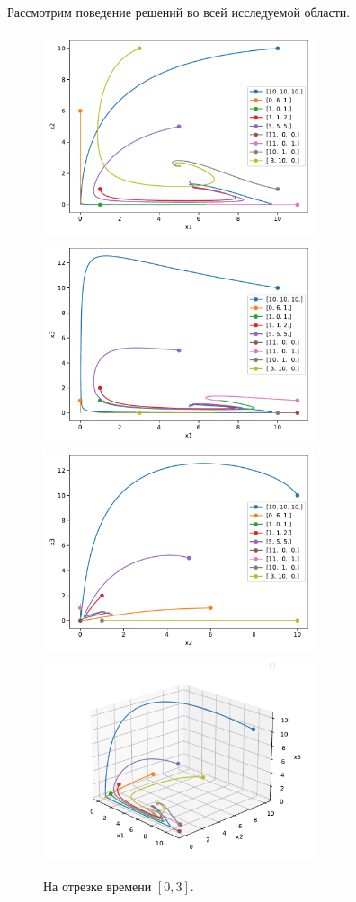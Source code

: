     Рассмотрим поведение решений во всей исследуемой области.
    \begin{figure}[H]
        \centering
        \includegraphics[width=8cm]{pictures/kx_12phase.pdf}
        \includegraphics[width=8cm]{pictures/kx_13phase.pdf}
        \includegraphics[width=8cm]{pictures/kx_23phase.pdf}
        \includegraphics[width=8cm]{pictures/kx_phase3.pdf}
        \caption{На отрезке времени \( [0, 3] \).} \label{k3d1}
    \end{figure}

